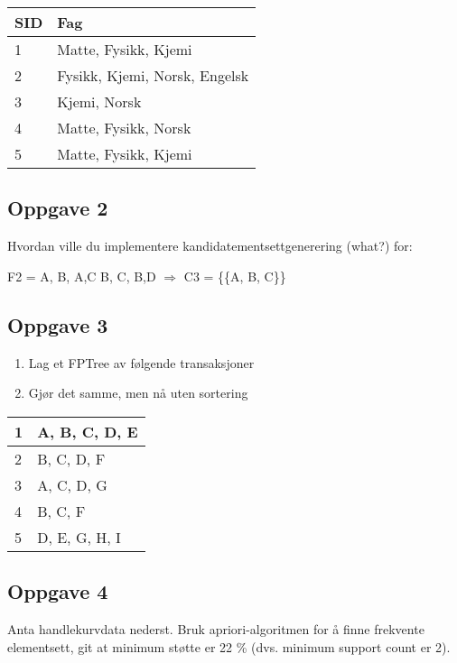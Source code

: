 			\begin{table}[H]
				\begin{tabular}{| l | l |}
					\hline
					{\bf SID} & {\bf Fag} \\ \hline
					1 & Matte, Fysikk, Kjemi \\ \hline
					2 & Fysikk, Kjemi, Norsk, Engelsk \\ \hline
					3 & Kjemi, Norsk \\ \hline
					4 & Matte, Fysikk, Norsk \\ \hline
					5 & Matte, Fysikk, Kjemi \\ \hline
				\end{tabular}
			\end{table}

		\subsection*{Oppgave 2}

			Hvordan ville du implementere kandidatementsettgenerering (what?) for:

			F2 = {{A, B}, {A,C} {B, C}, {B,D}} $\Rightarrow$ C3 = \{\{A, B, C\}\}

		\subsection*{Oppgave 3}

			\begin{enumerate}
				\item Lag et FPTree av følgende transaksjoner
				\item Gjør det samme, men nå uten sortering
			\end{enumerate}

			\begin{table}[H]
				\begin{tabular}{| l | l | }
					\hline
					1 & A, B, C, D, E \\ \hline
					2 & B, C, D, F \\ \hline
					3 & A, C, D, G \\ \hline
					4 & B, C, F \\ \hline
					5 & D, E, G, H, I \\ \hline
				\end{tabular}
			\end{table}

		\subsection*{Oppgave 4}
			Anta handlekurvdata nederst. Bruk apriori-algoritmen for å finne frekvente elementsett,
			git at minimum støtte er 22 \% (dvs. minimum support count er 2).

